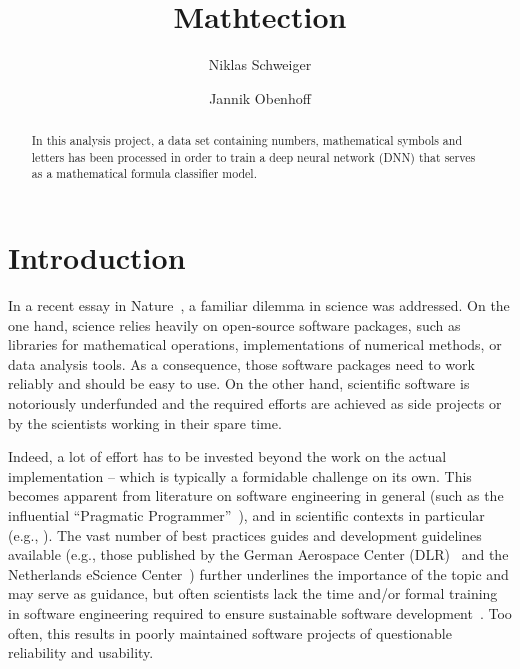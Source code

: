 \documentclass[@CLASSOPTIONS@]{tumarticle}
\title{Mathtection}
\author[affil={1}, email={niklas.schweiger@tum.de}]{Niklas Schweiger}
\author[affil={1}, email={jannik.obenhoff@tum.de}]{Jannik Obenhoff}
\affil{Department of Electrical and Computer Engineering, Technical
  University of Munich, Arcisstr. 21, 80333 Munich, Germany}
\begin{document}
\twocolumn

\maketitle
\begin{abstract}
  In this analysis project, a data set containing numbers, mathematical
  symbols and letters has been processed in order to train a deep neural network (DNN) that
  serves as a mathematical formula classifier model.
\end{abstract}
\section{Introduction}
In a recent essay in Nature~\cite{nowogrodzki2019}, a familiar dilemma in
science was addressed. On the one hand, science relies heavily on
open-source software packages, such as libraries for mathematical operations,
implementations of numerical methods, or data analysis tools. As a
consequence, those software packages need to work reliably and should be
easy to use. On the other hand, scientific software is notoriously
underfunded and the required efforts are achieved as side projects or by the
scientists working in their spare time.

Indeed, a lot of effort has to be invested beyond the work on the actual
implementation -- which is typically a formidable challenge on its own. This
becomes apparent from literature on software engineering in general (such as
the influential ``Pragmatic Programmer''~\cite{hunt1999pragmatic}), and in
scientific contexts in particular (e.g.,
\cite{prlic2012, bangerth2013, wilson2014, wilson2017}). The vast number of
best practices guides and development guidelines available (e.g., those
published by the German Aerospace Center (DLR)~\cite{schlauch2018dlrguide}
and the Netherlands eScience Center~\cite{netherlands-guide2019}) further
underlines the importance of the topic and may serve as guidance, but often
scientists lack the time and/or formal training in software engineering
required to ensure sustainable software
development~\cite{nowogrodzki2019, wilson2014, wilson2017}. Too often, this
results in poorly maintained software projects of questionable reliability
and usability.
\end{document}
